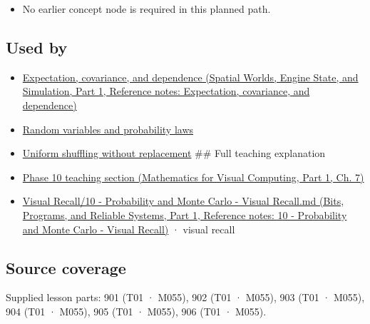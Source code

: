 \begin{itemize}
\tightlist
\item
  No earlier concept node is required in this planned path.
\end{itemize}

\subsection{Used by}\label{appendix-f1ef323f6ed7-used-by}

\hypertarget{appendix-f1ef323f6ed7-used-by}{}

\begin{itemize}
\item
  \href{../05-Spatial-Worlds-Engine-State-and-Simulation-P01/main.pdf\#appendix-54c383df9992}{Expectation, covariance, and dependence (Spatial Worlds, Engine State, and Simulation, Part 1, Reference notes: Expectation, covariance, and dependence)}
\item
  \hyperref[appendix-4d0203f7944f]{Random variables and probability laws}
\item
  \hyperref[appendix-184fcc411663]{Uniform shuffling without replacement} \#\# Full teaching explanation
\item
  \href{../02-Mathematics-for-Visual-Computing-P01/main.pdf\#02-foundations-ii-ch023-a-probability-model-begins-with-possible-outcomes}{Phase 10 teaching section (Mathematics for Visual Computing, Part 1, Ch. 7)}
\item
  \href{../01-Bits-Programs-and-Reliable-Systems-P01/main.pdf\#appendix-cb5af353ef77}{Visual Recall/10 - Probability and Monte Carlo - Visual Recall.md (Bits, Programs, and Reliable Systems, Part 1, Reference notes: 10 - Probability and Monte Carlo - Visual Recall)} · visual recall
\end{itemize}

\subsection{Source coverage}\label{appendix-f1ef323f6ed7-source-coverage}

\hypertarget{appendix-f1ef323f6ed7-source-coverage}{}

Supplied lesson parts: 901 (T01 · M055), 902 (T01 · M055), 903 (T01 · M055), 904 (T01 · M055), 905 (T01 · M055), 906 (T01 · M055).
